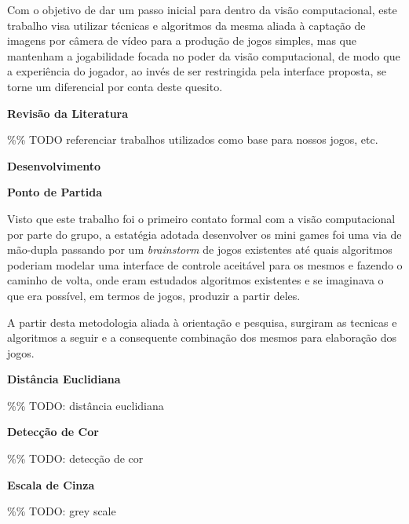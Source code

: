 \documentclass[a4paper]{article}
\begin{document}
Com o objetivo de dar um passo inicial para dentro da visão computacional, este trabalho visa utilizar técnicas e algoritmos da mesma aliada à captação de imagens por câmera de vídeo para a produção de jogos simples, mas que mantenham a jogabilidade focada no poder da visão computacional, de modo que a experiência do jogador, ao invés de ser restringida pela interface proposta, se torne um diferencial por conta deste quesito.

\break

\begin{center}
\textbf{\Large Revisão da Literatura}
\end{center}

\%\% TODO referenciar trabalhos utilizados como base para nossos jogos, etc.\\

\break


\begin{center}
\textbf{\Large Desenvolvimento}
\end{center}

\begin{flushleft}
\textbf{\large Ponto de Partida}
\end{flushleft}

Visto que este trabalho foi o primeiro contato formal com a visão computacional por parte do grupo, a estatégia adotada desenvolver os mini games foi uma via de mão-dupla passando por um \textit{brainstorm} de jogos existentes até quais algoritmos poderiam modelar uma interface de controle aceitável para os mesmos e fazendo o caminho de volta, onde eram estudados algoritmos existentes e se imaginava o que era possível, em termos de jogos, produzir a partir deles.

A partir desta metodologia aliada à orientação e pesquisa, surgiram as tecnicas e algoritmos a seguir e a consequente combinação dos mesmos para elaboração dos jogos. 

\begin{flushleft}
\textbf{\large Distância Euclidiana}
\end{flushleft}
\%\% TODO: distância euclidiana

\begin{flushleft}
\textbf{\large Detecção de Cor}
\end{flushleft}
\%\% TODO: detecção de cor

\begin{flushleft}
\textbf{\large Escala de Cinza}
\end{flushleft}
\%\% TODO: grey scale
\end{document}
